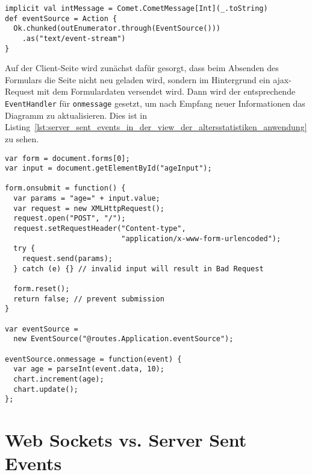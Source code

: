 \begin{lstlisting}[caption=Server Sent Events im Controller der Altersstatistiken-Anwendung, label=lst:server_sent_events_im_controller_der_altersstatistiken_anwendung]
implicit val intMessage = Comet.CometMessage[Int](_.toString)
def eventSource = Action {
  Ok.chunked(outEnumerator.through(EventSource()))
    .as("text/event-stream")
}
\end{lstlisting}

Auf der Client-Seite wird zunächst dafür gesorgt, dass beim Absenden des Formulars die Seite nicht neu geladen wird, sondern im Hintergrund ein \gls{ajax}-Request mit dem Formulardaten versendet wird.
Dann wird der entsprechende \lstinline|EventHandler| für \lstinline|onmessage| gesetzt, um nach Empfang neuer Informationen das Diagramm zu aktualisieren.
Dies ist in Listing~\ref{lst:server_sent_events_in_der_view_der_altersstatistiken_anwendung} zu sehen.

\begin{lstlisting}[caption=Server Sent Events in der View der Altersstatistiken-Anwendung, label=lst:server_sent_events_in_der_view_der_altersstatistiken_anwendung]
var form = document.forms[0];
var input = document.getElementById("ageInput");

form.onsubmit = function() {
  var params = "age=" + input.value;
  var request = new XMLHttpRequest();
  request.open("POST", "/");
  request.setRequestHeader("Content-type",
                           "application/x-www-form-urlencoded");
  try {
    request.send(params);
  } catch (e) {} // invalid input will result in Bad Request

  form.reset();
  return false; // prevent submission
}

var eventSource =
  new EventSource("@routes.Application.eventSource");

eventSource.onmessage = function(event) {
  var age = parseInt(event.data, 10);
  chart.increment(age);
  chart.update();
};
\end{lstlisting}



\section{Web Sockets vs. Server Sent Events} %
\label{sec:web_sockets_vs_server_sent_events}

